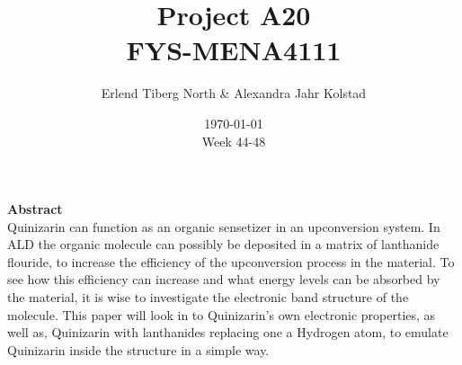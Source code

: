 \documentclass{article}
\begin{document}
\addtocounter{page}{0}

\title{Project A20 \\
      \large FYS-MENA4111}
\date{\today \\
    \vspace{1mm}
    \large Week 44-48}

\author{Erlend Tiberg North \& Alexandra Jahr Kolstad}

\maketitle






\vspace{1cm}


\begin{center}

{\Large\textbf{Abstract}} \label{sec:Abstract} \\

    Quinizarin can function as an organic sensetizer in an upconversion system. In ALD the organic molecule can possibly be deposited in a matrix of lanthanide flouride, to increase the efficiency of the upconversion process in the material. To see how this efficiency can increase and what energy levels can be absorbed by the material, it is wise to investigate the electronic band structure of the molecule. This paper will look in to Quinizarin's own electronic properties, as well as, Quinizarin with lanthanides replacing one a Hydrogen atom, to emulate Quinizarin inside the structure in a simple way.

    \vspace{1cm}

\end{center}


\newpage

\vspace{1cm}

\tableofcontents

\vspace{1cm}

\end{document}
